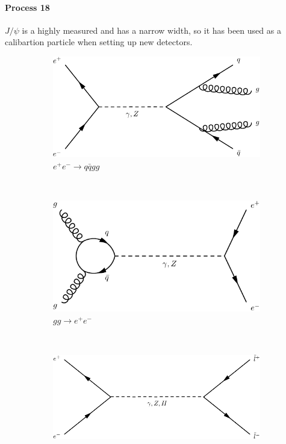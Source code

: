 \paragraph{Process 18}
$J/\psi$ is a highly measured and has a narrow width, so it has been used as a calibartion particle
when setting up new detectors.
\begin{figure}[h]
  \centering
  \begin{subfigure}[b]{0.3\textwidth}
    \includegraphics[width=\textwidth]{../dia/01.pdf}
    \caption{$e^+e^- \rightarrow q\bar{q}gg$}
    \label{fey:1}
  \end{subfigure}%
  ~
  \begin{subfigure}[b]{0.3\textwidth}
    \includegraphics[width=\textwidth]{../dia/02.pdf}
    \caption{$gg\rightarrow e^+e^-$}
    \label{fey:2}
  \end{subfigure}%
  ~
  \begin{subfigure}[b]{0.3\textwidth}
    \includegraphics[width=\textwidth]{../dia/03.pdf}

\end{subfigure}
\end{figure}
